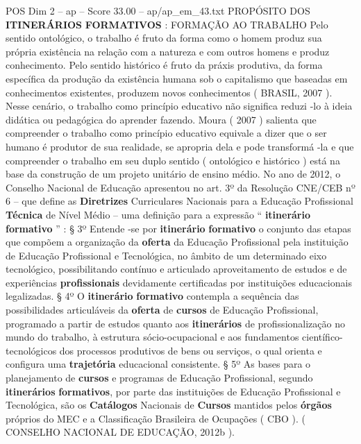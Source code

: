 \begin{textsample}{POS Dim 2 – ap – Score 33.00 – ap/ap\_em\_43.txt}  \label{ex:f2_pos_142}
PROPÓSITO DOS \textbf{ITINERÁRIOS} \textbf{FORMATIVOS} : FORMAÇÃO AO TRABALHO Pelo sentido ontológico, o trabalho é fruto da forma como o homem produz sua própria existência na relação com a natureza e com outros homens e produz conhecimento.
Pelo sentido histórico é fruto da práxis produtiva, da forma específica da produção da existência humana sob o capitalismo que baseadas em conhecimentos existentes, produzem novos conhecimentos ( BRASIL, 2007 ).
Nesse cenário, o trabalho como princípio educativo não significa reduzi -lo à ideia didática ou pedagógica do aprender fazendo.
Moura ( 2007 ) salienta que compreender o trabalho como princípio educativo equivale a dizer que o ser humano é produtor de sua realidade, se apropria dela e pode transformá -la e que compreender o trabalho em seu duplo sentido ( ontológico e histórico ) está na base da construção de um projeto unitário de ensino médio.
No ano de 2012, o Conselho Nacional de Educação apresentou no art. 3º da Resolução CNE/CEB nº 6 – que define as \textbf{Diretrizes} Curriculares Nacionais para a Educação Profissional \textbf{Técnica} de Nível Médio – uma definição para a expressão “ \textbf{itinerário} \textbf{formativo} ” : § 3º Entende -se por \textbf{itinerário} \textbf{formativo} o conjunto das etapas que compõem a organização da \textbf{oferta} da Educação Profissional pela instituição de Educação Profissional e Tecnológica, no âmbito de um determinado eixo tecnológico, possibilitando contínuo e articulado aproveitamento de estudos e de experiências \textbf{profissionais} devidamente certificadas por instituições educacionais legalizadas. § 4º O \textbf{itinerário} \textbf{formativo} contempla a sequência das possibilidades articuláveis da \textbf{oferta} de \textbf{cursos} de Educação Profissional, programado a partir de estudos quanto aos \textbf{itinerários} de profissionalização no mundo do trabalho, à estrutura sócio-ocupacional e aos fundamentos científico-tecnológicos dos processos produtivos de bens ou serviços, o qual orienta e configura uma \textbf{trajetória} educacional consistente. § 5º As bases para o planejamento de \textbf{cursos} e programas de Educação Profissional, segundo \textbf{itinerários} \textbf{formativos}, por parte das instituições de Educação Profissional e Tecnológica, são os \textbf{Catálogos} Nacionais de \textbf{Cursos} mantidos pelos \textbf{órgãos} próprios do MEC e a Classificação Brasileira de Ocupações ( CBO ). ( CONSELHO NACIONAL DE EDUCAÇÃO, 2012b ).

\end{textsample}
